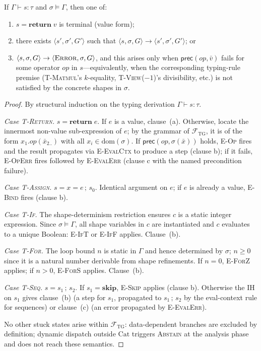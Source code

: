 \begin{theorem}[Progress]\label{thm:progress}
If $\Gamma\vdash s:\tau$ and $\sigma\models\Gamma$, then one of:
\begin{enumerate}
 \item $s=\mathbf{return}\;v$ is terminal (value form);
 \item there exists $\langle s',\sigma',G'\rangle$ such that
 $\langle s,\sigma,G\rangle\to\langle s',\sigma',G'\rangle$; or
 \item $\langle s,\sigma,G\rangle\to\langle\textsc{Error},\sigma,G\rangle$,
 and this arises only when $\mathsf{prec}(\mathit{op},\bar v)$
 fails for some operator $\mathit{op}$ in $s$---equivalently,
 when the corresponding typing-rule premise
 (\textsc{T-Matmul}'s $k$-equality,
 \textsc{T-View($-1$)}'s divisibility, etc.)
 is not satisfied by the concrete shapes in $\sigma$.
\end{enumerate}
\end{theorem}
\begin{proof}
By structural induction on the typing derivation $\Gamma\vdash s:\tau$.

\emph{Case \textsc{T-Return}.}
$s=\mathbf{return}\;e$.
If $e$ is a value, clause~(a).
Otherwise, locate the innermost non-value sub-expression of $e$;
by the grammar of $\mathcal{F}_{\mathrm{TG}}$, it is of the form
$x_1.\mathit{op}(\bar x_{2..})$ with all $x_i\in\mathrm{dom}(\sigma)$.
If $\mathsf{prec}(\mathit{op},\sigma(\bar x))$ holds, \textsc{E-Op} fires and
the result propagates via \textsc{E-EvalCtx} to produce a step (clause b);
if it fails, \textsc{E-OpErr} fires followed by \textsc{E-EvalErr}
(clause c with the named precondition failure).

\emph{Case \textsc{T-Assign}.}
$s=x=e\,;\,s_0$.
Identical argument on $e$; if $e$ is already a value,
\textsc{E-Bind} fires (clause b).

\emph{Case \textsc{T-If}.}
The shape-determinism restriction ensures $c$ is a static integer expression.
Since $\sigma\models\Gamma$, all shape variables in $c$ are instantiated
and $c$ evaluates to a unique Boolean: \textsc{E-IfT} or \textsc{E-IfF}
applies. Clause~(b).

\emph{Case \textsc{T-For}.}
The loop bound $n$ is static in $\Gamma$ and hence determined by $\sigma$;
$n\geq 0$ since it is a natural number derivable from shape refinements.
If $n=0$, \textsc{E-ForZ} applies; if $n>0$, \textsc{E-ForS} applies.
Clause~(b).

\emph{Case \textsc{T-Seq}.}
$s=s_1\,;\,s_2$.
If $s_1=\mathbf{skip}$, \textsc{E-Skip} applies (clause b).
Otherwise the IH on $s_1$ gives clause~(b) (a step for $s_1$,
propagated to $s_1\,;\,s_2$ by the eval-context rule for sequences)
or clause~(c) (an error propagated by \textsc{E-EvalErr}).

\smallskip\noindent
No other stuck states arise within $\mathcal{F}_{\mathrm{TG}}$:
data-dependent branches are excluded by definition;
dynamic dispatch outside $\mathrm{Cat}$ triggers \textsc{Abstain} at the
analysis phase and does not reach these semantics.
\end{proof}

